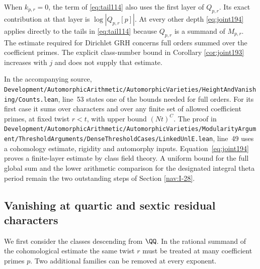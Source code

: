 \documentclass[a4paper,11pt]{article}
\theoremstyle{definition}
\theoremstyle{remark}
\newcommand{\srcloc}[2]{{\small\nolinkurl{#1.lean}}, line~#2}
\numberwithin{equation}{section}
\begin{document}
When \(k_{p,r}=0\), the term of \eqref{eq:tail114} also uses
the first layer of \(Q_{p,r}\). Its exact contribution at
that layer is \(\log|Q_{p,r}[p]|\). At every other depth
\eqref{eq:joint194} applies directly to the tails in
\eqref{eq:tail114} because \(Q_{p,r}\) is a summand of
\(M_{p,r}\). The estimate required for Dirichlet GRH concerns
full orders summed over the coefficient primes. The explicit
class-number bound in Corollary \ref{cor:joint193} increases with
\(j\) and does not supply that estimate.

In the accompanying source, \srcloc{Development/AutomorphicArithmetic/AutomorphicVarieties/HeightAndVanishing/Counts}{53}
states one of the bounds needed for full orders. For its first
case it sums over characters and over any finite set of allowed
coefficient primes, at fixed twist \(r<t\), with upper bound
\((Nt)^C\). The proof in
\srcloc{Development/AutomorphicArithmetic/AutomorphicVarieties/ModularityArgument/ThresholdArguments/DenseThresholdCases/LinkedUnlE}{49}
uses a cohomology estimate, rigidity and automorphy inputs.
Equation~\eqref{eq:joint194} proves a finite-layer estimate by
class field theory. A uniform bound for the full global sum and
the lower arithmetic comparison for the designated integral
theta period remain the two outstanding steps of Section \ref{nav:I-28}.

\subsection{Vanishing at quartic and sextic residual characters}\label{nav:III-33}
We first consider the classes descending from \(\QQ\). In the
rational summand of the cohomological estimate the same twist \(r\)
must be treated at many coefficient primes \(p\). Two additional
families can be removed at every exponent.
\end{document}
